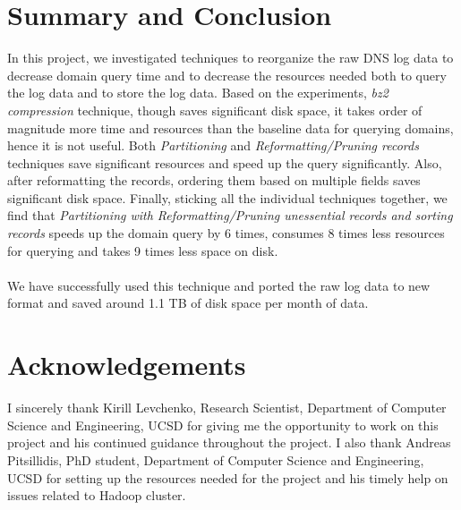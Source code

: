\documentclass[11pt,a4paper]{article}
\begin{document}
\section{Summary and Conclusion} 
In this project, we investigated techniques to reorganize the raw DNS log data to decrease domain query time and to decrease the resources needed both to query the log data and to store the log data. Based on the experiments, \textit{bz2 compression} technique, though saves significant disk space, it takes order of magnitude more time and resources than the baseline data for querying domains, hence it is not useful. Both \textit{Partitioning} and \textit{Reformatting/Pruning records} techniques save significant resources and speed up the query significantly. Also, after reformatting the records, ordering them based on multiple fields saves significant disk space. Finally, sticking all the individual techniques together, we find that \textit{Partitioning with Reformatting/Pruning unessential records and sorting records} speeds up the domain query by 6 times, consumes 8 times less resources for querying and takes 9 times less space on disk. 
\\\\
We have successfully used this technique and ported the raw log data to new format and saved around 1.1 TB of disk space per month of data.

\section*{Acknowledgements}
I sincerely thank Kirill Levchenko, Research Scientist, Department of Computer Science and Engineering, UCSD for giving me the opportunity to work on this project and his continued guidance throughout the project. I also thank Andreas Pitsillidis, PhD student, Department of Computer Science and Engineering, UCSD for setting up the resources needed for the project and his timely help on issues related to Hadoop cluster.
\end{document}
